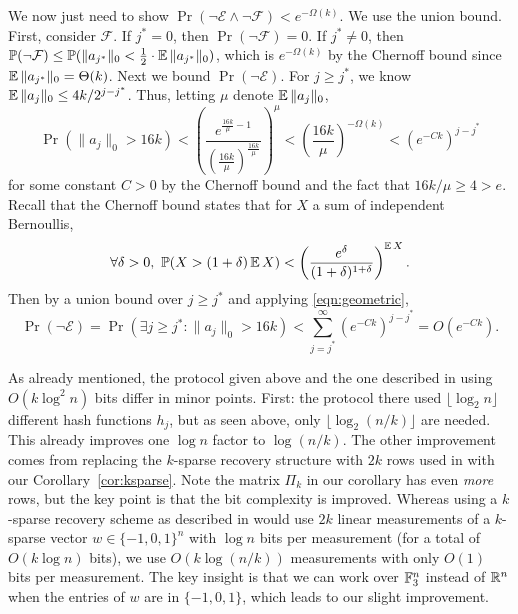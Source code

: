 We now just need to show $\Pr(\neg\mathcal{E} \wedge \neg\mathcal{F}) < e^{-\Omega(k)}$. We use the union bound. First, consider $\mathcal{F}$. If $j^* = 0$, then $\Pr(\neg\mathcal{F}) = 0$. If $j^*\neq 0$, then $\operatorname*{\mathbb{P}}(\neg\mathcal{F}) \le \operatorname*{\mathbb{P}}(\|a_{j^*}\|_0 < \frac 12 \cdot\operatorname*{\mathbb{E}}\|a_{j^*}\|_0)$, which is $e^{-\Omega(k)}$ by the Chernoff bound since $\operatorname*{\mathbb{E}}\|a_{j^*}\|_0 = \Theta(k)$. Next we bound $\Pr(\neg \mathcal{E})$. For $j\ge j^*$, we know $\operatorname*{\mathbb{E}}\|a_j\|_0 \le 4k/2^{j-j^*}$. Thus, letting $\mu$ denote $\operatorname*{\mathbb{E}}\|a_j\|_0$, 
\begin{equation}
\Pr(\|a_j\|_0 > 16k) < \left(\frac{e^{\frac{16k}{\mu} - 1}}{(\frac{16k}{\mu})^{\frac{16k}{\mu}}}\right)^\mu < \left(\frac{16k}{\mu}\right)^{-\Omega(k)} < (e^{-Ck})^{j-j^*}\label{eqn:geometric}
\end{equation}
for some constant $C>0$ by the Chernoff bound and the fact that $16k/\mu \ge 4 > e$. Recall that the Chernoff bound states that for $X$ a sum of independent Bernoullis,
$$
\forall \delta > 0,\ \operatorname*{\mathbb{P}}(X > (1+\delta) \operatorname*{\mathbb{E}} X) < \left(\frac{e^\delta}{(1+\delta)^{1+\delta}}\right)^{\operatorname*{\mathbb{E}} X} .
$$
Then by a union bound over $j\ge j^*$ and applying \eqref{eqn:geometric},
$$
\Pr(\neg \mathcal{E}) = \Pr(\exists j\ge j^*: \|a_j\|_0 > 16k) < \sum_{j=j^*}^\infty (e^{-Ck})^{j-j^*} = O(e^{-Ck}) .
$$

\begin{remark}\label{rem:recov}
\textup{
As already mentioned, the protocol given above and the one described in \cite{JowhariST11} using $O(k\log^2 n)$ bits differ in minor points. First: the protocol there used $\lfloor\log_2 n\rfloor$ different hash functions $h_j$, but as seen above, only $\lfloor \log_2(n/k)\rfloor$ are needed. This already improves one $\log n$ factor to $\log(n/k)$. The other improvement comes from replacing the $k$-sparse recovery structure with $2k$ rows used in \cite{JowhariST11} with our Corollary~\ref{cor:ksparse}. Note the matrix $\Pi_k$ in our corollary has even {\it more} rows, but the key point is that the bit complexity is improved. Whereas using a $k$-sparse recovery scheme as described in \cite{JowhariST11} would use $2k$ linear measurements of a $k$-sparse vector $w\in\{-1,0,1\}^n$ with $\log n$ bits per measurement (for a total of $O(k\log n)$ bits), we use $O(k\log(n/k))$ measurements with only $O(1)$ bits per measurement. The key insight is that we can work over $\mathbb{F}_3^n$ instead of $\mathbb{R}^n$ when the entries of $w$ are in $\{-1,0,1\}$, which leads to our slight improvement.
}
\end{remark}

